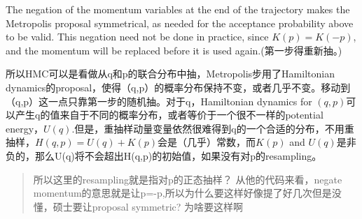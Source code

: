 \documentclass[
]{book}
\theoremstyle{definition}
\theoremstyle{definition}
\theoremstyle{definition}
\theoremstyle{remark}
\begin{document}
The negation of the momentum variables at the end of the trajectory makes the Metropolis proposal symmetrical, as needed for the acceptance probability above to be valid. This negation need not be done in practice, since \(K(p)=K(-p)\), and the momentum will be replaced before it is used again.(第一步得重新抽。)

所以HMC可以是看做从q和p的联合分布中抽，Metropolis步用了Hamiltonian dynamics的proposal，使得（q,p）的概率分布保持不变，或者几乎不变。移动到（q,p）这一点只靠第一步的随机抽。对于q，Hamiltonian dynamics for \((q,p)\)可以产生q的值来自于不同的概率分布，或者等价于一个很不一样的potential energy，\(U(q)\).但是，重抽样动量变量依然很难得到q的一个合适的分布，不用重抽样，\(H(q, p)=U(q)+K(p)\)会是（几乎）常数，而\(K(p)\) and \(U(q)\)是非负的，那么U(q)将不会超出H(q,p)的初始值，如果没有对p的resampling。

\begin{quote}
所以这里的resampling就是指对p的正态抽样？
从他的代码来看，negate momentum的意思就是让p=-p,所以为什么要这样好像提了好几次但是没懂，硕士要让proposal symmetric? 为啥要这样啊
\end{quote}
\end{document}
